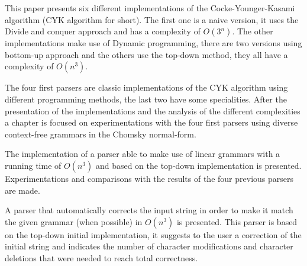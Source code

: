 This paper presents six different implementations of the Cocke-Younger-Kasami algorithm (CYK algorithm for short).
The first one is a naive version, it uses the Divide and conquer approach and has a complexity of $O(3^n)$.
The other implementations make use of Dynamic programming, there are two versions using bottom-up approach and the others use the top-down method, they all have a complexity of $O(n^3)$.

The four first parsers are classic implementations of the CYK algorithm using different programming methods, the last two have some specialities.
After the presentation of the implementations and the analysis of the different complexities a chapter is focused on experimentations with the four first parsers using diverse context-free grammars in the Chomsky normal-form.

The implementation of a parser able to make use of linear grammars with a running time of $O(n^3)$ and based on the top-down implementation is presented.
Experimentations and comparisons with the results of the four previous parsers are made.

A parser that automatically corrects the input string in order to make it match the given grammar (when possible) in $O(n^3)$ is presented.
This parser is based on the top-down initial implementation, it suggests to the user a correction of the initial string and indicates the number of character modifications and character deletions that were needed to reach total correctness.
